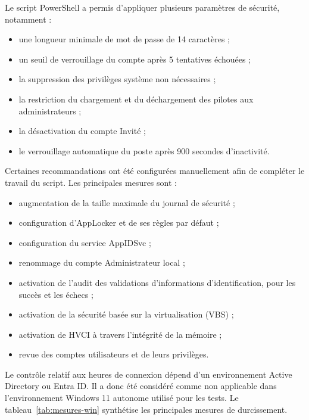 Le script PowerShell a permis d'appliquer plusieurs paramètres de sécurité, notamment :
\begin{itemize}
  \item une longueur minimale de mot de passe de 14 caractères ;
  \item un seuil de verrouillage du compte après 5 tentatives échouées ;
  \item la suppression des privilèges système non nécessaires ;
  \item la restriction du chargement et du déchargement des pilotes aux administrateurs ;
  \item la désactivation du compte Invité ;
  \item le verrouillage automatique du poste après 900 secondes d'inactivité.
\end{itemize}

Certaines recommandations ont été configurées manuellement afin de compléter le travail du script. Les principales mesures sont :
\begin{itemize}
  \item augmentation de la taille maximale du journal de sécurité ;
  \item configuration d'AppLocker et de ses règles par défaut ;
  \item configuration du service AppIDSvc ;
  \item renommage du compte Administrateur local ;
  \item activation de l'audit des validations d'informations d'identification, pour les succès et les échecs ;
  \item activation de la sécurité basée sur la virtualisation (VBS) ;
  \item activation de HVCI à travers l'intégrité de la mémoire ;
  \item revue des comptes utilisateurs et de leurs privilèges.
\end{itemize}
Le contrôle relatif aux heures de connexion dépend d'un environnement Active Directory ou Entra ID. Il a donc été considéré comme non applicable dans l'environnement Windows 11 autonome utilisé pour les tests. Le tableau~\ref{tab:mesures-win} synthétise les principales mesures de durcissement.

